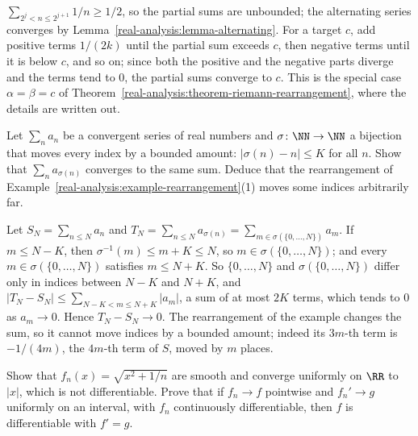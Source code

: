\begin{solution}
$\sum_{2^j < n \leq 2^{j+1}}1/n \geq 1/2$, so the partial sums are unbounded; the alternating series converges by Lemma~\ref{real-analysis:lemma-alternating}. For a target $c$, add positive terms
$1/(2k)$ until the partial sum exceeds $c$, then negative terms until it is below $c$, and so on; since both the positive and the negative parts diverge and the terms tend to $0$, the partial sums converge
to $c$. This is the special case $\alpha = \beta = c$ of Theorem~\ref{real-analysis:theorem-riemann-rearrangement}, where the details are written out.
\end{solution}

\begin{exercise}\label{real-analysis:exercise-bounded-rearrangement}
Let $\sum_na_n$ be a convergent series of real numbers and $\sigma \colon \NN \to \NN$ a bijection that moves every index by a bounded amount: $|\sigma(n) - n| \leq K$ for all $n$. Show that
$\sum_na_{\sigma(n)}$ converges to the same sum. Deduce that the rearrangement of Example~\ref{real-analysis:example-rearrangement}(1) moves some indices arbitrarily far.
\end{exercise}

\begin{solution}
Let $S_N = \sum_{n \leq N}a_n$ and $T_N = \sum_{n \leq N}a_{\sigma(n)} = \sum_{m \in \sigma(\{0, \ldots, N\})}a_m$. If $m \leq N - K$, then $\sigma^{-1}(m) \leq m + K \leq N$, so $m \in \sigma(\{0, \ldots, N\})$;
and every $m \in \sigma(\{0, \ldots, N\})$ satisfies $m \leq N + K$. So $\{0, \ldots, N\}$ and $\sigma(\{0, \ldots, N\})$ differ only in indices between $N - K$ and $N + K$, and
$|T_N - S_N| \leq \sum_{N - K < m \leq N + K}|a_m|$, a sum of at most $2K$ terms, which tends to $0$ as $a_m \to 0$. Hence $T_N - S_N \to 0$. The rearrangement of the example changes the sum, so it
cannot move indices by a bounded amount; indeed its $3m$-th term is $-1/(4m)$, the $4m$-th term of $S$, moved by $m$ places.
\end{solution}

\begin{exercise}\label{real-analysis:exercise-uniform-limit-derivative}
Show that $f_n(x) = \sqrt{x^2 + 1/n}$ are smooth and converge uniformly on $\RR$ to $|x|$, which is not differentiable. Prove that if $f_n \to f$ pointwise and $f_n' \to g$ uniformly on an interval, with
$f_n$ continuously differentiable, then $f$ is differentiable with $f' = g$.
\end{exercise}

